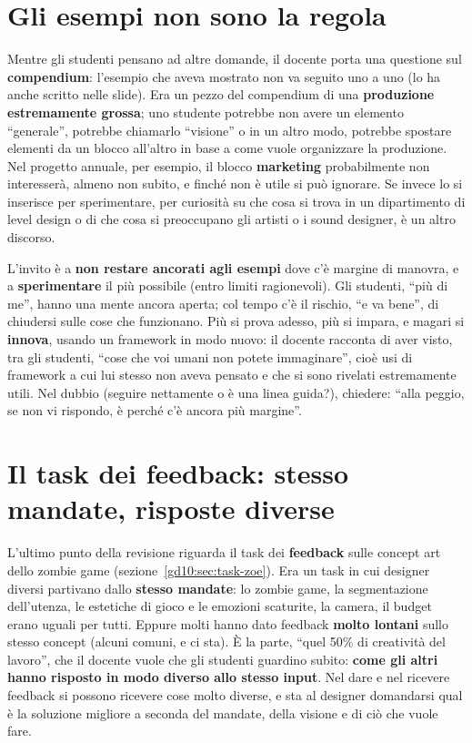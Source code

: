 \section{Gli esempi non sono la regola}
\label{gd15:sec:esempi}

Mentre gli studenti pensano ad altre domande, il docente porta una questione
sul \textbf{compendium}: l'esempio che aveva mostrato non va seguito uno a
uno (lo ha anche scritto nelle slide). Era un pezzo del compendium di una
\textbf{produzione estremamente grossa}; uno studente potrebbe non avere un
elemento ``generale'', potrebbe chiamarlo ``visione'' o in un altro modo,
potrebbe spostare elementi da un blocco all'altro in base a come vuole
organizzare la produzione. Nel progetto annuale, per esempio, il blocco
\textbf{marketing} probabilmente non interesserà, almeno non subito, e
finché non è utile si può ignorare. Se invece lo si inserisce per
sperimentare, per curiosità su che cosa si trova in un dipartimento di level
design o di che cosa si preoccupano gli artisti o i sound designer, è un
altro discorso.

L'invito è a \textbf{non restare ancorati agli esempi} dove c'è margine di
manovra, e a \textbf{sperimentare} il più possibile (entro limiti ragionevoli).
Gli studenti, ``più di me'', hanno una mente ancora aperta; col tempo c'è
il rischio, ``e va bene'', di chiudersi sulle cose che funzionano. Più si
prova adesso, più si impara, e magari si \textbf{innova}, usando un framework
in modo nuovo: il docente racconta di aver visto, tra gli studenti,
``cose che voi umani non potete immaginare'', cioè usi di framework a cui lui
stesso non aveva pensato e che si sono rivelati estremamente utili. Nel
dubbio (seguire nettamente o è una linea guida?), chiedere: ``alla peggio, se
non vi rispondo, è perché c'è ancora più margine''.

\section{Il task dei feedback: stesso mandate, risposte diverse}
\label{gd15:sec:zoe}

L'ultimo punto della revisione riguarda il task dei \textbf{feedback} sulle
concept art dello zombie game (sezione~\ref{gd10:sec:task-zoe}). Era un task
in cui designer diversi partivano dallo \textbf{stesso mandate}: lo zombie
game, la segmentazione dell'utenza, le estetiche di gioco e le emozioni
scaturite, la camera, il budget erano uguali per tutti. Eppure molti hanno
dato feedback \textbf{molto lontani} sullo stesso concept (alcuni comuni, e
ci sta). È la parte, ``quel 50\% di creatività del lavoro'', che il docente
vuole che gli studenti guardino subito: \textbf{come gli altri hanno risposto
in modo diverso allo stesso input}. Nel dare e nel ricevere feedback si
possono ricevere cose molto diverse, e sta al designer domandarsi qual è la
soluzione migliore a seconda del mandate, della visione e di ciò che vuole
fare.

